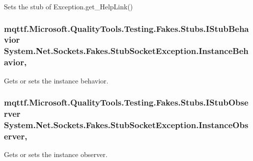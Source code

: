 Sets the stub of Exception.\-get\-\_\-\-Help\-Link()

\hypertarget{class_system_1_1_net_1_1_sockets_1_1_fakes_1_1_stub_socket_exception_a3a8a6615e6b4300e7bab2b65a2646e43}{
\subsubsection[{Instance\-Behavior}]{\setlength{\rightskip}{0pt plus 5cm}mqttf.\-Microsoft.\-Quality\-Tools.\-Testing.\-Fakes.\-Stubs.\-I\-Stub\-Behavior System.\-Net.\-Sockets.\-Fakes.\-Stub\-Socket\-Exception.\-Instance\-Behavior\hspace{0.3cm}{\ttfamily [get]}, {\ttfamily [set]}}}\label{class_system_1_1_net_1_1_sockets_1_1_fakes_1_1_stub_socket_exception_a3a8a6615e6b4300e7bab2b65a2646e43}


Gets or sets the instance behavior.

\hypertarget{class_system_1_1_net_1_1_sockets_1_1_fakes_1_1_stub_socket_exception_a4f04dc4cda39756100c998395e684dd0}{
\subsubsection[{Instance\-Observer}]{\setlength{\rightskip}{0pt plus 5cm}mqttf.\-Microsoft.\-Quality\-Tools.\-Testing.\-Fakes.\-Stubs.\-I\-Stub\-Observer System.\-Net.\-Sockets.\-Fakes.\-Stub\-Socket\-Exception.\-Instance\-Observer\hspace{0.3cm}{\ttfamily [get]}, {\ttfamily [set]}}}\label{class_system_1_1_net_1_1_sockets_1_1_fakes_1_1_stub_socket_exception_a4f04dc4cda39756100c998395e684dd0}


Gets or sets the instance observer.

